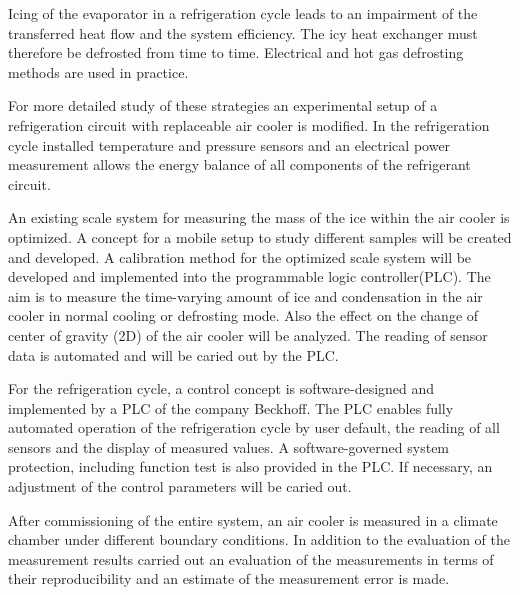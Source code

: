 Icing of the evaporator in a refrigeration cycle leads to an impairment of the transferred heat flow and the system efficiency. The icy heat exchanger must therefore be defrosted from time to time.  Electrical and hot gas defrosting methods are used in practice.

For more detailed study of these strategies an experimental setup of a refrigeration circuit with replaceable air cooler is modified. In the refrigeration cycle installed temperature and pressure sensors and an electrical power measurement allows the energy balance of all components of the refrigerant circuit.

An existing scale system for measuring the mass of the ice within the air cooler is optimized. A concept for a mobile setup to study different samples will be created and developed. A calibration method for the optimized scale system will be developed and implemented into the programmable logic controller(PLC). The aim is to measure the time-varying amount of ice and condensation in the air cooler in normal cooling or defrosting mode.  Also the effect on the change of center of gravity (2D) of the air cooler will be analyzed. The reading of sensor data is automated and will be caried out by the PLC.

For the refrigeration cycle, a control concept is software-designed and implemented by a PLC of the company Beckhoff. The PLC enables fully automated operation of the refrigeration cycle by user default, the reading of all sensors and the display of measured values. A software-governed system protection, including function test is also provided in the PLC. If necessary, an adjustment of the control parameters will be caried out.
 
After commissioning of the entire system, an air cooler is measured in a climate chamber under different boundary conditions. In addition to the evaluation of the measurement results carried out an evaluation of the measurements in terms of their reproducibility and an estimate of the measurement error is made.

